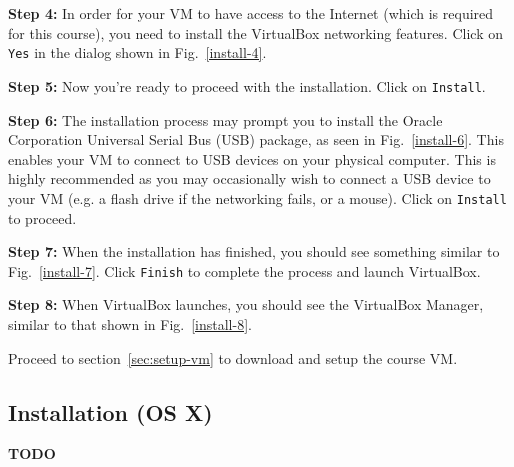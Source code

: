 \documentclass[11pt]{article}
\begin{document}
\textbf{Step 4:} In order for your VM to have access to the Internet (which is required for this course), you need to install the VirtualBox networking features. Click on \texttt{Yes} in the dialog shown in Fig.~\ref{install-4}.


\textbf{Step 5:} Now you're ready to proceed with the installation. Click on \texttt{Install}.

\textbf{Step 6:} The installation process may prompt you to install the Oracle Corporation Universal Serial Bus (USB) package, as seen in Fig.~\ref{install-6}. This enables your VM to connect to USB devices on your physical computer. This is highly recommended as you may occasionally wish to connect a USB device to your VM (e.g. a flash drive if the networking fails, or a mouse). Click on \texttt{Install} to proceed.

\textbf{Step 7:} When the installation has finished, you should see something similar to Fig.~\ref{install-7}. Click \texttt{Finish} to complete the process and launch VirtualBox.

\textbf{Step 8:} When VirtualBox launches, you should see the VirtualBox Manager, similar to that shown in Fig.~\ref{install-8}.

Proceed to section~\ref{sec:setup-vm} to download and setup the course VM.


\subsection{Installation (OS X)}
\label{subsec:install-osx}
\textbf{TODO}

\end{document}
